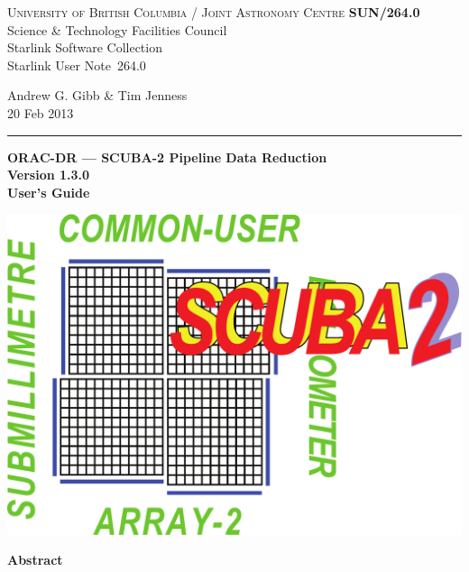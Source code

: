 \documentclass[twoside,11pt]{article}
\newcommand{\stardoccategory}  {Starlink User Note}
\newcommand{\stardocinitials}  {SUN}
\newcommand{\stardocnumber}    {264.0}
\newcommand{\stardocauthors}   {Andrew G. Gibb \& Tim Jenness}
\newcommand{\stardocdate}      {20 Feb 2013}
\newcommand{\stardoctitle}     {ORAC-DR --- SCUBA-2 Pipeline Data Reduction}
\newcommand{\stardocversion}   {Version 1.3.0}
\newcommand{\stardocmanual}    {User's Guide}
\newcommand{\stardocname}{\stardocinitials /\stardocnumber}
\newenvironment{latexonly}{}{}
\renewcommand{\_}{\texttt{\symbol{95}}}
\begin{document}
\thispagestyle{empty}

\begin{latexonly}
   \textsc{University of British Columbia} / \textsc{Joint Astronomy Centre} \hfill \textbf{\stardocname}\\
   {\large Science \& Technology Facilities Council}\\
   {\large Starlink Software Collection\\}
   {\large \stardoccategory\ \stardocnumber}
   \begin{flushright}
   \stardocauthors\\
   \stardocdate
   \end{flushright}
   \vspace{-4mm}
   \rule{\textwidth}{0.5mm}
   \vspace{5mm}
   \begin{center}
   {\Huge\textbf{\stardoctitle \\ [2.5ex]}}
   {\LARGE\textbf{\stardocversion \\ [4ex]}}
   {\Huge\textbf{\stardocmanual}}
   \end{center}
   \vspace{5mm}

\begin{center}
\includegraphics[scale=0.3]{sun264_logo}
\end{center}

   \vspace{10mm}
   \begin{center}
      {\Large\textbf{Abstract}}
   \end{center}
\end{latexonly}
\end{document}
